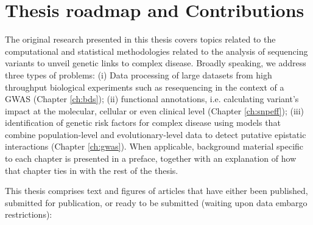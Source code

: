 \section{Thesis roadmap and Contributions}

The original research presented in this thesis covers topics related to the computational and statistical methodologies related to the analysis of sequencing variants to unveil genetic links to complex disease. Broadly speaking, we address three types of problems: (i) Data processing of large datasets from high throughput biological experiments such as resequencing in the context of a GWAS (Chapter \ref{ch:bds}); (ii) functional annotations, i.e. calculating variant's impact at the molecular, cellular or even clinical level (Chapter \ref{ch:snpeff}); (iii) identification of genetic risk factors for complex disease using models that combine population-level and evolutionary-level data to detect putative epistatic interactions (Chapter \ref{ch:gwas}). When applicable, background material specific to each chapter is presented in a preface, together with an explanation of how that chapter ties in with the rest of the thesis.

This thesis comprises text and figures of articles that have either been published, submitted for publication, or ready to be submitted (waiting upon data embargo restrictions):
\\

